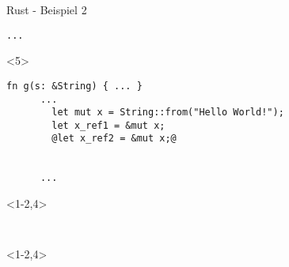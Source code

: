 \begin{frame}[fragile]{Rust - Beispiel 2}
\begin{onlyenv}
{\begin{lstlisting}[frame=single,style=base]
      ...
    \end{lstlisting}
  }
  \end{onlyenv}


  \begin{onlyenv}<5> {
    \begin{lstlisting}[frame=single,style=base]
      fn g(s: &String) { ... }
      ...
        let mut x = String::from("Hello World!");
        let x_ref1 = &mut x;
        @let x_ref2 = &mut x;@


      ...
    \end{lstlisting}
  }
  \end{onlyenv}

  \begin{onlyenv}<1-2,4> {
    \begin{lstlisting}[frame=single,style=base]
      

    \end{lstlisting}
  }
  \end{onlyenv}


  \begin{onlyenv}<1-2,4> {
    \begin{lstlisting}[frame=single,style=base]


    \end{lstlisting}
  }
  \end{onlyenv}

\end{frame}